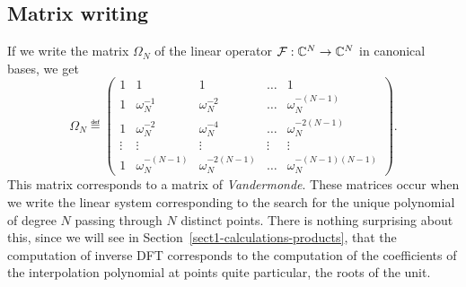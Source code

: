 \subsection{Matrix writing}
\label{sect1-matrix-writing} 
 
 
    If we write the matrix $ \Omega_N $ of the linear operator $ \mathcal{F}: \mathbb{C}^N \rightarrow \mathbb{C}^N $ in canonical bases, we get
\begin{equation}
\label{eq-defn-matrix-fourier}
\Omega_N \eqdef \begin{pmatrix} 1 & 1 & 1 & \ldots & 1 \\1 & \omega_N^{-1} & \omega_N^{- 2} & \ldots & \omega_N^{- (N- 1)} \\1 & \omega_N^{- 2} & \omega_N^{- 4} & \ldots & \omega_N^{- 2 (N-1)} \\\vdots & \vdots & \vdots & \vdots & \vdots \\1 & \omega_N^{- (N-1)} & \omega_N^{- 2 (N-1)} & \ldots & \omega_N^{- (N-1) (N-1 )} \end{pmatrix}.
\end{equation}
This matrix corresponds to a matrix of \textit{Vandermonde}. These matrices occur when we write the linear system corresponding to the search for the unique polynomial of degree $N$ passing through $N$ distinct points. There is nothing surprising about this, since we will see in Section~\ref{sect1-calculations-products}, that the computation of inverse DFT corresponds to the computation of the coefficients of the interpolation polynomial at points quite particular, the  roots of the unit.
 
